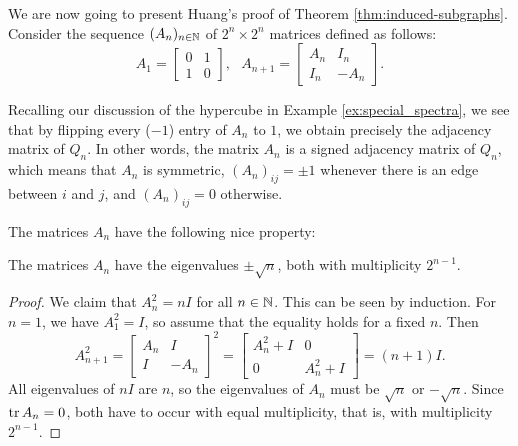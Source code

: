 We are now going to present Huang's proof of Theorem \ref{thm:induced-subgraphs}.
Consider the sequence $(A_n)_{n \in \mathbb{N}}$ of $2^n \times 2^n$ matrices defined as follows:
\begin{equation*}
    A_1 = \begin{bmatrix}
        0 & 1 \\ 1 & 0
    \end{bmatrix}, \ \ \ 
    A_{n + 1} = \begin{bmatrix}
        A_n & I_n \\ I_n & -A_n
    \end{bmatrix}.
\end{equation*}

Recalling our discussion of the hypercube in Example \ref{ex:special_spectra}, we see that by flipping every ($-1$) entry of $A_n$ to $1$, we obtain precisely the adjacency matrix of $Q_n$. 
In other words, the matrix $A_n$ is a signed adjacency matrix of $Q_n$, which means that $A_n$ is symmetric, $(A_n)_{ij} = \pm 1$ whenever there is an edge between $i$ and $j$, and $(A_n)_{ij} = 0$ otherwise. 

The matrices $A_n$ have the following nice property:

\begin{lemma} \label{lem:hypercube-matrices}    
    The matrices $A_n$ have the eigenvalues $\pm \sqrt{n}$, both with multiplicity $2^{n - 1}$.
\end{lemma}

\begin{proof}
    We claim that $A_n^2 = nI$ for all $n \in \mathbb{N}$. 
    This can be seen by induction.
    For $n = 1$, we have $A_1 ^2 = I$, so assume that the equality holds for a fixed $n$. 
    Then 
    \begin{equation*}
        A_{n + 1}^2 
        = \begin{bmatrix}
            A_n & I \\ I & -A_n
        \end{bmatrix}^2
        = \begin{bmatrix}
            A_n ^2 + I & 0 \\
            0 & A_n^2 + I
        \end{bmatrix}
        = (n + 1)I.
    \end{equation*}
    All eigenvalues of $nI$ are $n$, so the eigenvalues of $A_n$ must be $\sqrt{n}$ or $-\sqrt{n}$.
    Since $\operatorname{tr} A_n = 0$, both have to occur with equal multiplicity, that is, with multiplicity $2^{n - 1}$.
\end{proof}

